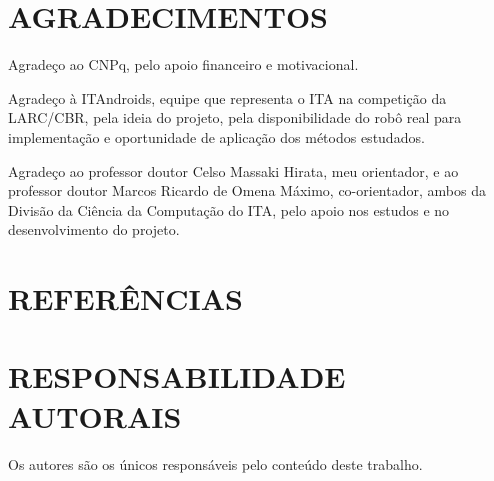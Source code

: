 \documentclass[10pt,fleqn,a4paper]{article}
\begin{document}
    \section{AGRADECIMENTOS}
    
	Agradeço ao CNPq, pelo apoio financeiro e motivacional.
	
	Agradeço à ITAndroids, equipe que representa o ITA na competição da LARC/CBR, pela ideia do projeto, pela disponibilidade do robô real para implementação e oportunidade de aplicação dos métodos estudados.

	Agradeço ao professor doutor Celso Massaki Hirata, meu orientador, e ao professor doutor Marcos Ricardo de Omena Máximo, co-orientador, ambos da Divisão da Ciência da Computação do ITA, pelo apoio nos estudos e no desenvolvimento do projeto.

    \section{REFERÊNCIAS}
        
        

    \section{RESPONSABILIDADE AUTORAIS}
    
        Os autores são os únicos responsáveis pelo conteúdo deste trabalho.
\end{document}
